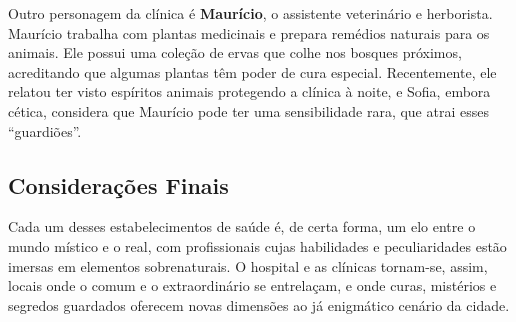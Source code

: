 {Outro personagem da clínica é \textbf{Maurício}, o assistente veterinário e herborista. Maurício trabalha com plantas medicinais e prepara remédios naturais para os animais. Ele possui uma coleção de ervas que colhe nos bosques próximos, acreditando que algumas plantas têm poder de cura especial. Recentemente, ele relatou ter visto espíritos animais protegendo a clínica à noite, e Sofia, embora cética, considera que Maurício pode ter uma sensibilidade rara, que atrai esses “guardiões”.}{}


\subsection{Considerações Finais}

Cada um desses estabelecimentos de saúde é, de certa forma, um elo entre o mundo místico e o real, com profissionais cujas habilidades e peculiaridades estão imersas em elementos sobrenaturais. O hospital e as clínicas tornam-se, assim, locais onde o comum e o extraordinário se entrelaçam, e onde curas, mistérios e segredos guardados oferecem novas dimensões ao já enigmático cenário da cidade.


